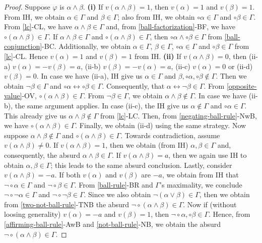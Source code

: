 \documentclass{amsart}
\renewcommand{\iff}{\longleftrightarrow}
\begin{document}
\begin{proof}
    Suppose $\varphi$ is $\alpha \land \beta$. 
    \textbf{(i)} If $v(\alpha \land \beta) = 1$, then $v(\alpha) = 1$ and $v(\beta) = 1$. From IH, we obtain $\alpha \in \Gamma$ and $\beta \in \Gamma$; also from IH, we obtain $\circ \alpha \in \Gamma$ and $\circ \beta \in \Gamma$. From \ref{lc}-CL, we have $\alpha \land \beta \in \Gamma$ and, from \ref{ball-factorization}-BF, we have $\circ (\alpha \land \beta) \in \Gamma$. If $\alpha \land \beta \in \Gamma$ and $\circ (\alpha \land \beta) \in \Gamma$, then $\circ \alpha \land \circ \beta \in \Gamma$ from \ref{ball-conjunction}-BC. Additionally, we obtain $\alpha \in \Gamma$, $\beta \in \Gamma$, $\circ \alpha \in \Gamma$ and $\circ \beta \in \Gamma$ from \ref{lc}-CL. Hence $v(\alpha) = 1$ and $v(\beta) = 1$ from IH. 
    \textbf{(ii)} If $v(\alpha \land \beta) = 0$, then (ii-a) $v(\alpha) = -v(\beta) = a$, (ii-b) $v(\beta) = - v(\alpha) = a$, (ii-c) $v(\alpha) = 0$ or (ii-d) $v(\beta) = 0$. In case we have (ii-a), IH give us $\alpha \in \Gamma$ and $\beta, \circ \alpha, \circ \beta \notin \Gamma$. Then we obtain $\lnot \beta \in \Gamma$ and 
    $\circ \alpha \iff \circ \beta \in \Gamma$. 
    Consequently, that $\alpha \iff \lnot \beta \in \Gamma$. From \ref{opposite-value}-OV, $\circ (\alpha \land \beta) \in \Gamma$. From $\lnot \beta \in \Gamma$, we obtain $\alpha \land \beta \notin \Gamma$. In case we have (ii-b), the same argument applies. In case (ii-c), the IH give us $\alpha \notin \Gamma$ and $\circ \alpha \in \Gamma$. This already give us $\alpha \land \beta \notin \Gamma$ from \ref{lc}-LC. Then, from \ref{negating-ball-rule}-NwB, we have $\circ (\alpha \land \beta) \in \Gamma$. Finally, we obtain (ii-d) using the same strategy.  Now suppose $\alpha \land \beta \notin \Gamma$ and $\circ (\alpha \land \beta) \in \Gamma$. Towards contradiction, assume $v(\alpha \land \beta) \neq 0$. If $v(\alpha \land \beta) = 1$, then we obtain (from IH) $\alpha, \beta \in \Gamma$ and, consequently, the absurd $\alpha \land \beta \in \Gamma$. If $v(\alpha \land \beta) = a$, then we again use IH to obtain $\alpha, \beta \in \Gamma$; this leads to the same absurd conclusion. Lastly, consider $v(\alpha \land \beta) = -a$. If both $v(\alpha)$ and $v(\beta)$ are $-a$, we obtain from IH that $\lnot \circ \alpha \in \Gamma$ and $\lnot \circ \beta \in \Gamma$. From \ref{ball-rule}-BR and $\Gamma$'s maximality, we conclude $\lnot \circ \lnot \alpha \in \Gamma$ and $\lnot \circ \lnot \beta \in \Gamma$. Since we also obtain $\lnot (\alpha \lor \beta) \in \Gamma$, then we obtain from \ref{two-not-ball-rule}-TNB the absurd $\lnot \circ (\alpha \land \beta) \in \Gamma$. Now if (without loosing generality) $v(\alpha)=-a$ and $v(\beta) = 1$, then $\lnot \circ \alpha, \circ \beta \in \Gamma$. Hence, from \ref{affirming-ball-rule}-AwB and \ref{not-ball-rule}-NB, we obtain the absurd $\lnot \circ (\alpha \land \beta) \in \Gamma$.

\end{proof}
\end{document}
